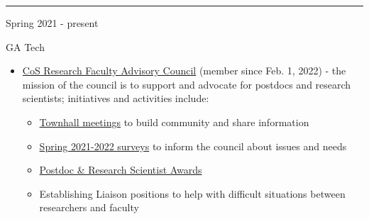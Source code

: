 \documentclass[a4paper,10pt]{article}
\newlength{\cvcolumngapwidth}
\newlength{\cvleftcolumnwidth}
\newlength{\cvrightcolumnwidth}
\newcommand{\cvsectionstyle}[1]{{\normalsize\cvsectionfont\textcolor{cvsectioncolor}{#1}}}
\newcommand{\cvtitlestyle}[1]{{\large\cvtitlefont\textcolor{cvtitlecolor}{#1}}}
\newcommand{\cvheadingstyle}[1]{{\normalsize\cvheadingfont\textcolor{cvheadingcolor}{#1}}}
\newlength{\cvafteritemskipamount}
\newlength{\cvaftersectionskipamount}
\newlength{\cvbetweensectionandheadingextraskipamount}
\newlength{\cvaftertitleskipamount}
\newlength{\cvparskip}
\newcommand{\cvsection}[1]{
            \begin{minipage}[t]{\cvleftcolumnwidth}
                \raggedleft\cvsectionstyle{#1}
            \end{minipage}%
            \hspace{\cvcolumngapwidth}%
            \begin{minipage}[t]{\cvrightcolumnwidth}
                \textcolor{cvrulecolor}{\rule{\cvrightcolumnwidth}{0.3mm}}
            \end{minipage}
        
            \vspace{\cvaftersectionskipamount}
        }
\newcommand{\cvitem}[2]{
            \begin{minipage}[t]{\cvleftcolumnwidth}
                \raggedleft #1
            \end{minipage}%
            \hspace{\cvcolumngapwidth}%
            \begin{minipage}[t]{\cvrightcolumnwidth}
                \setlength{\parskip}{\cvparskip} #2
            \end{minipage}
        
            \vspace{\cvafteritemskipamount}
        }
\newcommand{\cvtitle}[1]{
            \cvtitlestyle{#1}
        
            \vspace{\cvaftertitleskipamount}
            \vspace{-\cvparskip}
        }
\begin{document}
%        
%        
%  
        
        \cvsection{SERVICE}
        \vspace{\cvbetweensectionandheadingextraskipamount}
        
        
    
\cvitem{
    \cvheadingstyle{Spring 2021 - present}
}{
    \cvtitle{GA Tech }
            \begin{itemize}[leftmargin=*]
            \item \href{https://rfac.cos.gatech.edu/}{CoS Research Faculty Advisory Council} (member since Feb. 1, 2022) - the mission of the council is to support and advocate for postdocs and research scientists; initiatives and activities include:
            \begin{itemize}[leftmargin=*]
             \item \href{https://rfac.cos.gatech.edu/rf-community-and-support/town-halls/}{Townhall meetings} to build community and share information            
             \item \href{https://rfac.cos.gatech.edu/rf-community-and-support/climate-surveys/}{Spring 2021-2022 surveys} to inform the council about issues and needs
             \item \href{https://rfac.cos.gatech.edu/rf-community-and-support/research-faculty-awards/}{Postdoc \& Research Scientist Awards}
             \item Establishing Liaison positions to help with difficult situations between researchers and faculty 
	        \end{itemize}
	    \end{itemize}
	}
            
\end{document}
